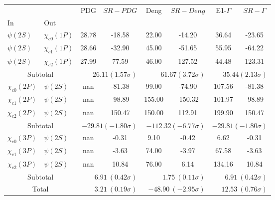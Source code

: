 \begin{tabular}{|l|l|c|c|c|c|c|c|}%
\hline%
&&PDG&$SR-PDG$&Deng&$SR-Deng$&E1-$\Gamma$&$SR-\Gamma$\\%
In&Out&&&&&&\\%
\hline%
$\psi(2S)$&$\chi_{c0}(1P)$&28.78&-18.58&22.00&-14.20&36.64&-23.65\\%
$\psi(2S)$&$\chi_{c1}(1P)$&28.66&-32.90&45.00&-51.65&55.95&-64.22\\%
$\psi(2S)$&$\chi_{c2}(1P)$&27.99&77.59&46.00&127.52&44.48&123.31\\%
\hline%
\hline%
\multicolumn{2}{|c|}{Subtotal}&\multicolumn{2}{|r|}{$26.11 (1.57\sigma)$}&\multicolumn{2}{|r|}{$61.67 (3.72\sigma)$}&\multicolumn{2}{|r|}{$35.44 (2.13\sigma)$}\\%
\hline%
\hline%
$\chi_{c0}(2P)$&$\psi(2S)$&nan&-81.38&99.00&-74.90&107.56&-81.38\\%
$\chi_{c1}(2P)$&$\psi(2S)$&nan&-98.89&155.00&-150.32&101.97&-98.89\\%
$\chi_{c2}(2P)$&$\psi(2S)$&nan&150.47&150.00&112.91&199.90&150.47\\%
\hline%
\hline%
\multicolumn{2}{|c|}{Subtotal}&\multicolumn{2}{|r|}{$-29.81 (-1.80\sigma)$}&\multicolumn{2}{|r|}{$-112.32 (-6.77\sigma)$}&\multicolumn{2}{|r|}{$-29.81 (-1.80\sigma)$}\\%
\hline%
\hline%
$\chi_{c0}(3P)$&$\psi(2S)$&nan&-0.31&9.10&-0.42&6.62&-0.31\\%
$\chi_{c1}(3P)$&$\psi(2S)$&nan&-3.63&74.00&-3.97&67.58&-3.63\\%
$\chi_{c2}(3P)$&$\psi(2S)$&nan&10.84&76.00&6.14&134.16&10.84\\%
\hline%
\hline%
\multicolumn{2}{|c|}{Subtotal}&\multicolumn{2}{|r|}{$6.91~(0.42\sigma)$}&\multicolumn{2}{|r|}{$1.75~(0.11\sigma)$}&\multicolumn{2}{|r|}{$6.91~(0.42\sigma)$}\\%
\hline%
\hline%
\multicolumn{2}{|c|}{Total}&\multicolumn{2}{|r|}{$3.21~(0.19\sigma)$}&\multicolumn{2}{|r|}{$-48.90~(-2.95\sigma)$}&\multicolumn{2}{|r|}{$12.53~(0.76\sigma)$}\\%
\hline%
\end{tabular}